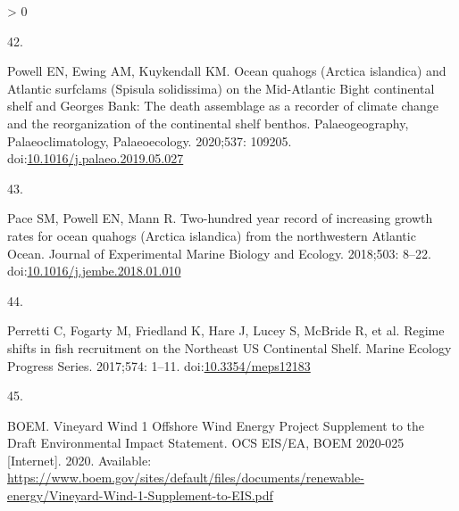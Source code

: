 \documentclass[
  10pt,
]{article}
\newlength{\cslhangindent}
\newlength{\csllabelwidth}
\newenvironment{CSLReferences}[2] %
 {%
  \setlength{\parindent}{0pt}
  \ifodd #1 \everypar{\setlength{\hangindent}{\cslhangindent}}\ignorespaces\fi
  \ifnum #2 > 0
  \setlength{\parskip}{#2\baselineskip}
  \fi
 }%
 {}
\newcommand{\CSLLeftMargin}[1]{\parbox[t]{\csllabelwidth}{#1}}
\newcommand{\CSLRightInline}[1]{\parbox[t]{\linewidth - \csllabelwidth}{#1}\break}
\begin{document}
\begin{CSLReferences}{0}{0}
\leavevmode\hypertarget{ref-powell_ocean_2020}{}%
\CSLLeftMargin{42. }
\CSLRightInline{Powell EN, Ewing AM, Kuykendall KM. Ocean quahogs
({Arctica} islandica) and {Atlantic} surfclams ({Spisula} solidissima)
on the {Mid}-{Atlantic} {Bight} continental shelf and {Georges} {Bank}:
{The} death assemblage as a recorder of climate change and the
reorganization of the continental shelf benthos. Palaeogeography,
Palaeoclimatology, Palaeoecology. 2020;537: 109205.
doi:\href{https://doi.org/10.1016/j.palaeo.2019.05.027}{10.1016/j.palaeo.2019.05.027}}

\leavevmode\hypertarget{ref-pace_two-hundred_2018}{}%
\CSLLeftMargin{43. }
\CSLRightInline{Pace SM, Powell EN, Mann R. Two-hundred year record of
increasing growth rates for ocean quahogs ({Arctica} islandica) from the
northwestern {Atlantic} {Ocean}. Journal of Experimental Marine Biology
and Ecology. 2018;503: 8--22.
doi:\href{https://doi.org/10.1016/j.jembe.2018.01.010}{10.1016/j.jembe.2018.01.010}}

\leavevmode\hypertarget{ref-perretti_regime_2017}{}%
\CSLLeftMargin{44. }
\CSLRightInline{Perretti C, Fogarty M, Friedland K, Hare J, Lucey S,
McBride R, et al. Regime shifts in fish recruitment on the {Northeast}
{US} {Continental} {Shelf}. Marine Ecology Progress Series. 2017;574:
1--11. doi:\href{https://doi.org/10.3354/meps12183}{10.3354/meps12183}}

\leavevmode\hypertarget{ref-boem_vineyard_2020}{}%
\CSLLeftMargin{45. }
\CSLRightInline{BOEM. Vineyard {Wind} 1 {Offshore} {Wind} {Energy}
{Project} {Supplement} to the {Draft} {Environmental} {Impact}
{Statement}. {OCS} {EIS}/{EA}, {BOEM} 2020-025 {[}Internet{]}. 2020.
Available:
\url{https://www.boem.gov/sites/default/files/documents/renewable-energy/Vineyard-Wind-1-Supplement-to-EIS.pdf}}

\end{CSLReferences}
\end{document}
